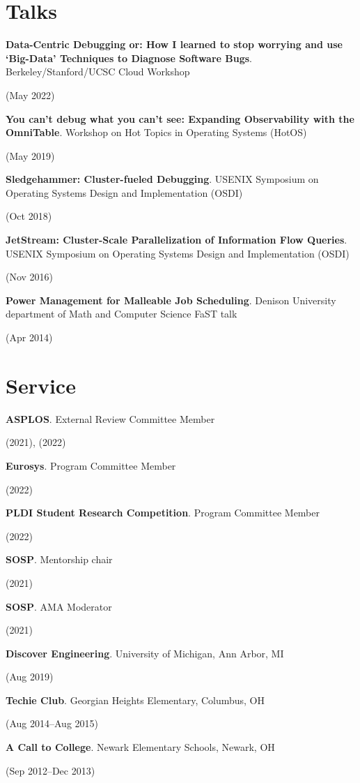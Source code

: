 \documentclass[letterpaper,10pt]{article}
\newcommand{\sidebyside}[2]{
  \begin{minipage}[t]{.75\textwidth}
    \raggedright{}
    #2
  \end{minipage}
  \hspace{.01\textwidth}
    \begin{minipage}[t]{.205\textwidth}
    \raggedleft
    #1
  \end{minipage}
}
\newcommand{\trio}[3]{\sidebyside{#3}{\textbf{#1}. #2}}
\begin{document}
\section{Talks}
\begin{smenumerate}
\item\trio{Data-Centric Debugging or: How I learned to stop worrying
  and use `Big-Data' Techniques to Diagnose Software
  Bugs}{Berkeley/Stanford/UCSC Cloud Workshop}{(May 2022)}
\item\trio{You can't debug what you can't see: Expanding Observability
  with the OmniTable}{Workshop on Hot Topics in Operating Systems
  (HotOS)}{(May 2019)}
\item\trio{Sledgehammer: Cluster-fueled Debugging}{USENIX Symposium on
  Operating Systems Design and Implementation (OSDI)}{(Oct 2018)}
\item\trio{JetStream: Cluster-Scale Parallelization of Information
  Flow Queries}{USENIX Symposium on Operating Systems Design and
  Implementation (OSDI)}{(Nov 2016)}
\item\trio{Power Management for Malleable Job Scheduling}{Denison
  University department of Math and Computer Science FaST talk}{(Apr
  2014)}
\end{smenumerate}


\section{Service}
\begin{smenumerate}
\item\trio{ASPLOS}{External Review Committee Member}{(2021), (2022)}
\item\trio{Eurosys}{Program Committee Member}{(2022)}
\item\trio{PLDI Student Research Competition}{Program Committee Member}{(2022)}
\item\trio{SOSP}{Mentorship chair}{(2021)}
\item\trio{SOSP}{AMA Moderator}{(2021)}
\item\trio{Discover Engineering}{University of Michigan, Ann Arbor, MI}{(Aug 2019)}
\item\trio{Techie Club}{Georgian Heights Elementary, Columbus, OH}{(Aug 2014--Aug 2015)}
\item\trio{A Call to College}{Newark Elementary Schools, Newark, OH}{(Sep 2012--Dec 2013)}
\end{smenumerate}
\end{document}

